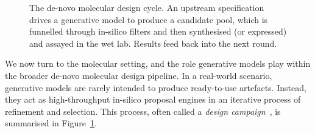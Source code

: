 \documentclass[12pt,a4paper,twoside]{report}
\begin{document}
\begin{figure}[!ht]
\centering
{}
\caption{The de-novo molecular design cycle. An upstream specification drives a generative model to produce a candidate pool, which is funnelled through in-silico filters and then synthesised (or expressed) and assayed in the wet lab. Results feed back into the next round.}
\label{fig:design-cycle}
\end{figure}

We now turn to the molecular setting, and the role generative models play within the broader de-novo molecular design pipeline. In a real-world scenario, generative models are rarely intended to produce ready-to-use artefacts. Instead, they act as high-throughput in-silico proposal engines in an iterative process of refinement and selection. This process, often called a \emph{design campaign}~\cite{Schneider2018}, is summarised in Figure~\ref{fig:design-cycle}.
\end{document}
